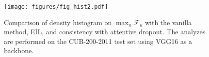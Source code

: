 \begin{figure}[t]
	\centering
    \texttt{[image: figures/fig\_hist2.pdf]}
    \vspace{-0.5em}
    \caption{Comparison of density histogram on $\max_u{\mathcal{F}}_u$ with the vanilla method, EIL, and consistency with attentive dropout. The analyzes are performed on the CUB-200-2011 test set using VGG16 as a backbone.}
    \label{fig:hist_max}
\end{figure}